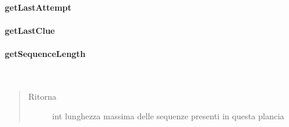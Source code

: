 \documentclass[letterpaper,10pt,italian,openany,oneside]{sphinxmanual}
\begin{document}
\paragraph{getLastAttempt}
\label{\detokenize{source/it/unicam/cs/pa/mastermind/gamecore/BoardModel:getlastattempt}}

\begin{fulllineitems}
\label{\detokenize{source/it/unicam/cs/pa/mastermind/gamecore/BoardModel:it.unicam.cs.pa.mastermind.gamecore.BoardModel.getLastAttempt()}}
\end{fulllineitems}



\paragraph{getLastClue}
\label{\detokenize{source/it/unicam/cs/pa/mastermind/gamecore/BoardModel:getlastclue}}

\begin{fulllineitems}
\label{\detokenize{source/it/unicam/cs/pa/mastermind/gamecore/BoardModel:it.unicam.cs.pa.mastermind.gamecore.BoardModel.getLastClue()}}
\end{fulllineitems}



\paragraph{getSequenceLength}
\label{\detokenize{source/it/unicam/cs/pa/mastermind/gamecore/BoardModel:getsequencelength}}

\begin{fulllineitems}
\label{\detokenize{source/it/unicam/cs/pa/mastermind/gamecore/BoardModel:it.unicam.cs.pa.mastermind.gamecore.BoardModel.getSequenceLength()}}~\begin{quote}\begin{description}
\item[{Ritorna}] \leavevmode
int lunghezza massima delle sequenze presenti in questa plancia

\end{description}\end{quote}

\end{fulllineitems}
\end{document}
